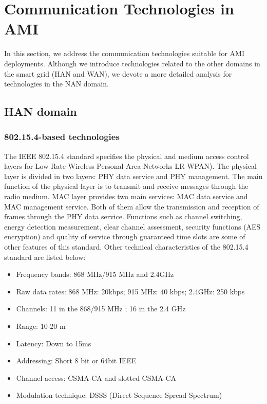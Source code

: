 \documentclass[11pt,draftclsnofoot,onecolumn]{IEEEtran}
\begin{document}
\section{Communication Technologies in AMI}\label{technologies}

In this section, we address the communication technologies suitable for AMI deployments. Although we introduce technologies related to the other domains in the smart grid (HAN and WAN), we devote a more detailed analysis for technologies in the NAN domain. 

\subsection{HAN domain}

\subsubsection{802.15.4-based technologies}\label{tech::802154}

The IEEE 802.15.4 standard specifies the physical and medium access control layers for Low Rate-Wireless Personal Area Networks LR-WPAN). The physical layer is divided in two layers: PHY data service and PHY management. The main function of the physical  layer is to transmit and receive messages through the radio medium. MAC layer provides two main services: MAC data service and MAC management service. Both of them allow the transmission and reception of frames through the PHY data service. Functions such as channel switching, energy detection measurement, clear channel assessment, security functions (AES encryption) and quality of service through guaranteed time slots are some of other features of this standard. Other technical characteristics of the 802.15.4 standard are listed below:

\begin{itemize}
	\item Frequency bands: 868 MHz/915 MHz and 2.4GHz
	\item Raw data rates: 868 MHz: 20kbps; 915 MHz: 40 kbps; 2.4GHz: 250 kbps
	\item Channels: 11 in the 868/915 MHz ; 16 in the 2.4 GHz
	\item Range: 10-20 m
	\item Latency: Down to 15ms
	\item Addressing: Short  8 bit or 64bit IEEE
	\item Channel access: CSMA-CA and slotted CSMA-CA
	\item Modulation technique: DSSS (Direct Sequence Spread Spectrum)
\end{itemize}  
\end{document}
